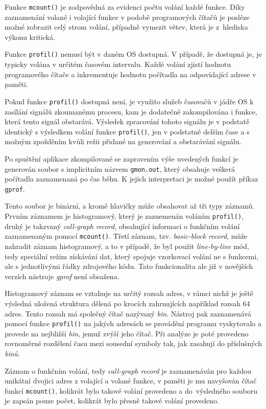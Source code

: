 \documentclass[czech,BP]{thesiskiv}
\begin{document}
Funkce \texttt{mcount()} je zodpovědná za evidenci počtu volání každé funkce. Díky zaznamenání volané i volající funkce v podobě programových čítačů je posléze možné zobrazit celý strom volání, případně vymezit větev, která je z~hlediska výkonu kritická.

Funkce \texttt{profil()} nemusí být v daném OS dostupná. V případě, že dostupná je, je typicky volána v určitém časovém intervalu. Každé volání zjistí hodnotu programového čítače a inkrementuje hodnotu počítadla na odpovídající adrese v paměti.

Pokud funkce \texttt{profil()} dostupná není, je využito služeb časovačů v jádře OS k zasílání signálů zkoumanému procesu, kam je dodatečně zakompilována i funkce, která tento signál obstarává. Výsledek zpracování tohoto signálu je v podstatě identický s výsledkem volání funkce \texttt{profil()}, jen v podstatně delším čase a s možným zpožděním kvůli režii přidané na generování a obstarávání signálu.

Po spuštění aplikace zkompilované se zapravením výše uvedených funkcí je generován soubor s implicitním názvem \texttt{gmon.out}, který obsahuje veškerá počítadla zaznamenaná po čas běhu. K jejich interpretaci je možné použít příkaz \texttt{gprof}.

Tento soubor je binární, a kromě hlavičky může obsahovat až tři typy záznamů. Prvním záznamem je histogramový, který je zaznemenán voláním \texttt{profil()}, druhý je takzvaný \emph{call-graph record}, obsahující informaci o funkčním volání zaznamenaným pomocí \texttt{mcount()}. Třetí záznam, tzv. \emph{basic-block record}, může nahradit záznam histogramový, a to v případě, že byl použit \emph{line-by-line} mód, tedy speciální režim získávání dat, který spojuje vzorkovací volání ne s funkcemi, ale s jednotlivými řádky zdrojového kódu. Tato funkcionalita ale již v novějších verzích nástroje \emph{gprof} není obsažena\cite{gprof1}.

Histogramový záznam se vztahuje na určitý rozsah adres, v rámci nichž je ještě výsledná uložená struktura dělená po krocích zahrnujících například rozsah 64 adres. Tento rozsah má společný čítač nazývaný \emph{bin}. Nástroj pak zaznamenává pomocí funkce \texttt{profil()} na jakých adresách se provádění programu vyskytovalo a provede  na nejbližší \emph{bin}, jemuž zvýší jeho čítač. Při analýze je poté provedeno rovnoměrné rozdělení času mezi sousední symboly tak, jak zasahují do příslušných \emph{binů}.

Záznam o funkčním volání, tedy \emph{call-graph record} je zaznamenáván pro každou unikátní dvojici adres z volající a volané funkce, v paměti je mu navyšován čítač funkcí \texttt{mcount()}, kolikrát bylo takové volání provedeno a do~výsledného souboru je zapsán pouze počet, kolikrát bylo přesně takové volání provedeno.
\end{document}
